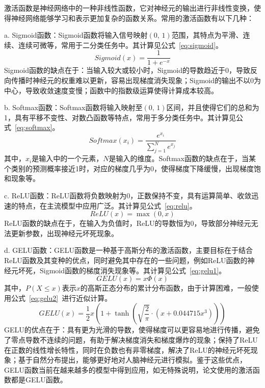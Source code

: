 激活函数是神经网络中的一种非线性函数，它对神经元的输出进行非线性变换，使得神经网络能够学习和表示更加复杂的函数关系。常用的激活函数有以下几种：

a. Sigmoid函数：Sigmoid函数将输入信号映射\((0,\,1)\)范围，其特点为平滑、连续、连续可微等，常用于二分类任务中。其计算见公式~\ref{eq:sigmoid}。
\begin{equation}
    Sigmoid(x) = \frac{1}{1 + e^{-x}}
    \label{eq:sigmoid}
\end{equation}
Sigmoid函数的缺点在于：当输入较大或较小时，Sigmoid的导数趋近于0，导致反向传播时神经元的权重难以更新，容易出现梯度消失现象；Sigmoid的输出不以0为中心，导致收敛速度变慢；函数中的指数级运算使得计算成本较高。

b. Softmax函数：Softmax函数将输入映射至\((0,\,1)\)区间，并且使得它们的总和为1，具有平移不变性、对数凸函数等特点，常用于多分类任务中。其计算见公式~\ref{eq:softmax}。
\begin{equation}
    Softmax(x_i) = \frac{e^{x_i}}{\sum_{j=1}^{N} e^{x_j}}
    \label{eq:softmax}
\end{equation}
其中，\(x_i\)是输入中的一个元素，\(N\)是输入的维度。Softmax函数的缺点在于，当某个类别的预测概率接近1时，对应的梯度几乎为0，使得梯度下降缓慢，出现梯度饱和现象等。

c. ReLU函数\cite{glorot2011proceedings}：ReLU函数将负数映射为0，正数保持不变，具有运算简单、收敛迅速的特点，在主流模型中应用广泛。其计算见公式~\ref{eq:relu}。
\begin{equation}
    ReLU(x) = \max(0, x)
    \label{eq:relu}
\end{equation}
ReLU函数的缺点在于，在输入为负值时，ReLU的导数恒为0，导致部分神经元无法更新参数，出现神经元坏死现象。

d. GELU函数\cite{hendrycks2016gaussian}：GELU函数是一种基于高斯分布的激活函数，主要目标在于结合ReLU函数及其变种的优点，同时避免其中存在的一些问题，例如ReLU函数的神经元坏死，Sigmoid函数的梯度消失现象等。其计算见公式~\ref{eq:gelu1}。
\begin{equation}
    GELU(x) = x\Phi(x)
    \label{eq:gelu1}
\end{equation}
其中，\(P(X \le x)\)表示\(x\)的高斯正态分布的累计分布函数，由于计算困难，一般使用公式~\ref{eq:gelu2}~进行近似计算。
\begin{equation}
    GELU(x) = \frac{1}{2}x\left(1 + \tanh\left(\sqrt{\frac{2}{\pi}} \cdot \left(x + 0.044715x^3\right)\right)\right)
    \label{eq:gelu2}
\end{equation}
GELU的优点在于：具有更为光滑的导数，使得梯度可以更容易地进行传播，避免了零点导数不连续的问题，有助于解决梯度消失和梯度爆炸的现象；保持了ReLU在正数的线性增长特性，同时在负数也有非零梯度，解决了ReLU的神经元坏死现象；基于自然分布提出，能够更好地对人脑神经元进行模拟。鉴于这些优点，GELU函数当前在越来越多的模型中得到应用，如无特殊说明，论文使用的激活函数都是GELU函数。

